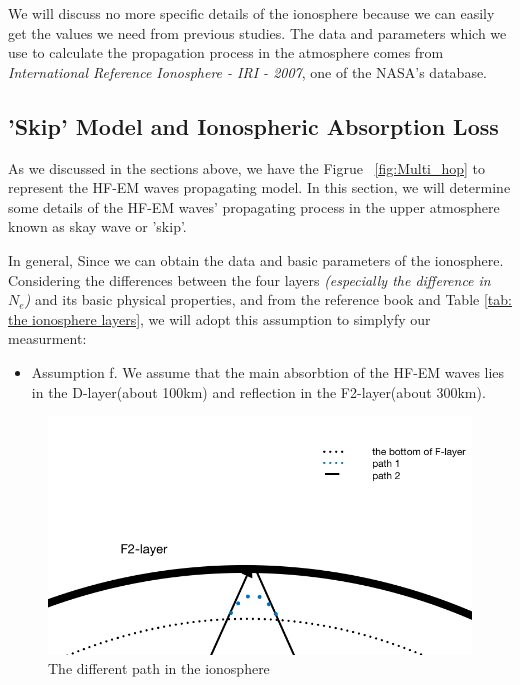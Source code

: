 \documentclass{mcmthesis}
\begin{document}
    We will discuss no more specific details of the ionosphere because we can easily get the values we need from previous studies. The data and parameters which we use to calculate the propagation process in the atmosphere comes from \emph{International Reference Ionosphere - IRI - 2007}\cite{NASAIonosphere}, one of the NASA's database.


  \subsection{'Skip' Model and Ionospheric Absorption Loss}

    As we discussed in the sections above, we have the Figrue ~\ref{fig:Multi_hop} to represent the HF-EM waves propagating model. In this section, we will determine some details of the HF-EM waves' propagating process in the upper atmosphere known as skay wave or 'skip'.

    In general, Since we can obtain the data and basic parameters of the ionosphere. Considering the differences between the four layers \emph{(especially the difference in $N_{e}$)} and its basic physical properties, and from the reference book\cite{davies1990ionospheric,terman1943radio} and Table \ref{tab: the ionosphere layers}, we will adopt this assumption to simplyfy our measurment:

    \begin{itemize}
      \item Assumption f. We assume that the main absorbtion of the HF-EM waves lies in the D-layer(about 100km) and reflection in the F2-layer(about 300km).
    \end{itemize}

    \begin{figure}[ht]
    \centering
    \includegraphics[scale=0.5]{PathinIonosphere}
    \caption{The different path in the ionosphere}
    \label{fig:PathinIonosphere}
    \end{figure}
\end{document}
